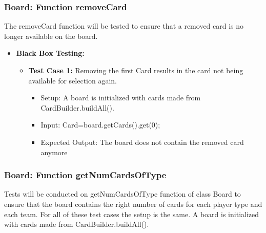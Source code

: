 \documentclass[12pt]{article}
\begin{document}


\subsubsection{Board: Function removeCard}
The removeCard function will be tested to ensure that a removed card is no longer available on the board.
\begin{itemize}
    \item \textbf{Black Box Testing:}
    \begin{itemize}
        \item \textbf{Test Case 1:} Removing the first Card results in the card not being available for selection again.
            \begin{itemize}
            \item Setup: A board is initialized with cards made from CardBuilder.buildAll().
            \item Input: Card=board.getCards().get(0);
            \item Expected Output: The board does not contain the removed card anymore
        \end{itemize}
    \end{itemize}
\end{itemize}



\subsubsection{Board: Function getNumCardsOfType}
Tests will be conducted on getNumCardsOfType function of class Board to ensure that the board contains the right number of cards for each player type and each team. For all of these test cases the setup is the same. A board is initialized with cards made from CardBuilder.buildAll().
\end{document}
